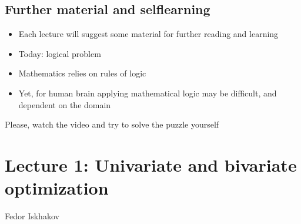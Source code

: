 \documentclass[letterpaper,10pt,english]{jupyterBook}
\begin{document}
\section{Further material and self\sphinxhyphen{}learning}
\label{\detokenize{01.introduction:further-material-and-self-learning}}\begin{itemize}
\item {} 
\sphinxAtStartPar
Each lecture will suggest some material for further reading and learning

\item {} 
\sphinxAtStartPar
Today:  logical problem

\item {} 
\sphinxAtStartPar
Mathematics relies on rules of logic

\item {} 
\sphinxAtStartPar
Yet, for human brain applying mathematical logic may be difficult, and dependent on the domain

\end{itemize}

\sphinxAtStartPar
Please, watch the video and try to solve the puzzle yourself

\sphinxstepscope


\chapter{Lecture 1: Univariate and bivariate optimization}
\label{\detokenize{02.optimization_intro:lecture-1-univariate-and-bivariate-optimization}}\label{\detokenize{02.optimization_intro::doc}}
\sphinxAtStartPar
{}
Fedor Iskhakov
\end{document}
